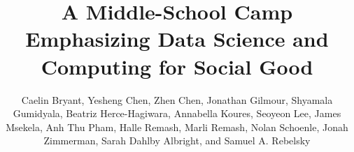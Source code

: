 \documentclass[sigconf]{acmart}
\begin{document}
\title[A Middle School Camp: Data Science \& Computing for Social Good]{A Middle-School Camp Emphasizing Data Science and Computing for Social Good}

\author{Caelin Bryant, Yesheng Chen, Zhen Chen, Jonathan Gilmour, Shyamala Gumidyala, Beatriz Herce-Hagiwara, Annabella Koures, Seoyeon Lee, James Msekela, Anh Thu Pham, Halle Remash, Marli Remash, Nolan Schoenle, Jonah Zimmerman, Sarah Dahlby Albright, and Samuel A. Rebelsky}

\renewcommand{\shortauthors}{Bryant \textit{et al.}}





\maketitle






\balance
 
\end{document}
